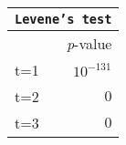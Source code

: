\begin{tabular}{l r}
\toprule
\multicolumn{2}{c}{\texttt{Levene's test}}\\
\midrule
& \textit{p}-value \\
\midrule
t=1 & $10^{-131}$\\
t=2 & $0$\\
t=3 & $0$\\
\bottomrule
\end{tabular}
